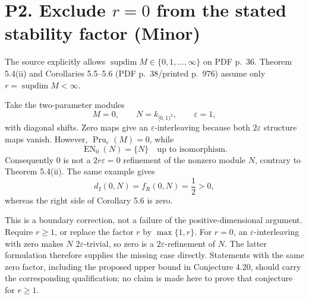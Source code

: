 \documentclass[10pt]{article}
\begin{document}
\section*{P2. Exclude \(r=0\) from the stated stability factor (Minor)}
The source explicitly allows \(\operatorname{supdim}M\in\{0,1,\ldots,\infty\}\) on PDF p. 36. Theorem 5.4(ii) and Corollaries 5.5–5.6 (PDF p. 38/printed p. 976) assume only \(r=\operatorname{supdim}M<\infty\).\par
Take the two-parameter modules \[M=0,\qquad N=k_{[0,1)^2},\qquad \varepsilon=1,\] with diagonal shifts. Zero maps give an \(\varepsilon\)-interleaving because both \(2\varepsilon\) structure maps vanish. However, \(\operatorname{Pru}_\varepsilon(M)=0\), while \[\operatorname{EN}_0(N)=\{N\}\quad\text{up to isomorphism}.\] Consequently \(0\) is not a \(2r\varepsilon=0\) refinement of the nonzero module \(N\), contrary to Theorem 5.4(ii). The same example gives \[d_I(0,N)=f_R(0,N)=\frac12>0,\] whereas the right side of Corollary 5.6 is zero.\par
This is a boundary correction, not a failure of the positive-dimensional argument. Require \(r\geq1\), or replace the factor \(r\) by \(\max\{1,r\}\). For \(r=0\), an \(\varepsilon\)-interleaving with zero makes \(N\) \(2\varepsilon\)-trivial, so zero is a \(2\varepsilon\)-refinement of \(N\). The latter formulation therefore supplies the missing case directly. Statements with the same zero factor, including the proposed upper bound in Conjecture 4.20, should carry the corresponding qualification; no claim is made here to prove that conjecture for \(r\geq1\).\par
\end{document}
